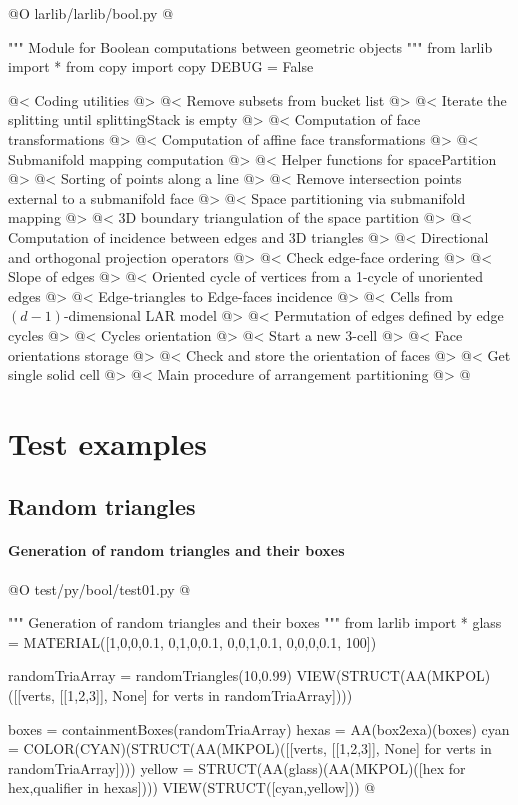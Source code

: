 \documentclass[11pt,oneside]{article}    %
\begin{document}
@O larlib/larlib/bool.py
@{""" Module for Boolean computations between geometric objects """
from larlib import *
from copy import copy
DEBUG = False

@< Coding utilities @>
@< Remove subsets from bucket list @>
@< Iterate the splitting until splittingStack is empty @>
@< Computation of face transformations @>
@< Computation of affine face transformations @>
@< Submanifold mapping computation @>
@< Helper functions for spacePartition @>
@< Sorting of points along a line @>
@< Remove intersection points external to a submanifold face @>
@< Space partitioning via submanifold mapping @>
@< 3D boundary triangulation of the space partition @>
@< Computation of incidence between edges and 3D triangles @>
@< Directional and orthogonal projection operators @>
@< Check edge-face ordering @>
@< Slope of edges @>
@< Oriented cycle of vertices from a 1-cycle of unoriented edges @>
@< Edge-triangles to Edge-faces incidence @>
@< Cells from $(d-1)$-dimensional LAR model @>
@< Permutation of edges defined by edge cycles @>
@< Cycles orientation @>
@< Start a new 3-cell @>
@< Face orientations storage @>
@< Check and store the orientation of faces @>
@< Get single solid cell @>
@< Main procedure of arrangement partitioning @>
@}
    
\section{Test examples}

\subsection{Random triangles}


\paragraph{Generation of random triangles and their boxes}
@O test/py/bool/test01.py
@{""" Generation of random triangles and their boxes """
from larlib import *
glass = MATERIAL([1,0,0,0.1,  0,1,0,0.1,  0,0,1,0.1, 0,0,0,0.1, 100])

randomTriaArray = randomTriangles(10,0.99)
VIEW(STRUCT(AA(MKPOL)([[verts, [[1,2,3]], None] for verts in randomTriaArray])))

boxes = containmentBoxes(randomTriaArray)
hexas = AA(box2exa)(boxes)
cyan = COLOR(CYAN)(STRUCT(AA(MKPOL)([[verts, [[1,2,3]], None] for verts in randomTriaArray])))
yellow = STRUCT(AA(glass)(AA(MKPOL)([hex for hex,qualifier in hexas])))
VIEW(STRUCT([cyan,yellow]))
@}
\end{document}
